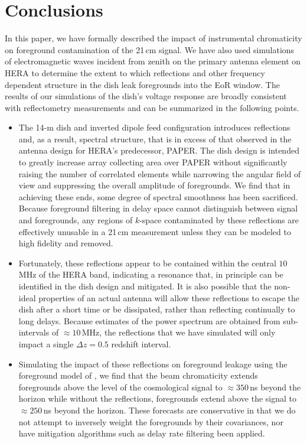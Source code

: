 \documentclass[twocolumn]{emulateapj}
\begin{document}
\section{Conclusions}\label{sec:Conclusion}
In this paper, we have formally described the impact of instrumental chromaticity on foreground contamination of the 21\,cm signal. We have also used simulations of electromagnetic waves incident from zenith on the primary antenna element on HERA to determine the extent to which reflections and other frequency dependent structure in the dish leak foregrounds into the EoR window. The results of our simulations of the dish's voltage response are broadly consistent with reflectometry measurements \citep{Patra:2016} and can be summarized in the following points. 
\begin{itemize}
\item The 14-m dish and inverted dipole feed configuration introduces reflections and, as a result, spectral structure, that is in excess of that observed in the antenna design for HERA's predecessor, PAPER. The dish design is intended to greatly increase array collecting area over PAPER without significantly raising the number of correlated elements while narrowing the angular field of view and suppressing the overall amplitude of foregrounds. We find that in achieving these ends, some degree of spectral smoothness has been sacrificed. Because foreground filtering in delay space cannot distinguish between signal and foregrounds, any regions of $k$-space contaminated by these reflections are effectively unusable in a 21\,cm measurement unless they can be modeled to high fidelity and removed. 

\item Fortunately, these reflections appear to be contained within the central $10$\,MHz of the HERA band, indicating a resonance that, in principle can be identified in the dish design and mitigated. It is also possible that the  non-ideal properties of an actual antenna will allow these reflections to escape the dish after a short time or be dissipated, rather than reflecting continually to long delays. Because estimates of the power spectrum are obtained from sub-intervals of $\approx10$\,MHz, the reflections that we have simulated will only impact a single $\Delta z=0.5$ redshift interval.

\item Simulating the impact of these reflections on foreground leakage using the foreground model of \citet{Thyagarajan:2016}, we find that the beam chromaticity extends foregrounds above the level of the cosmological signal to $\approx 350$\,ns beyond the horizon while without the reflections, foregrounds extend above the signal to $\approx 250$\,ns beyond the horizon. These forecasts are conservative in that we do not attempt to inversely weight the foregrounds by their covariances, nor have mitigation algorithms such as delay rate filtering been applied.


\end{itemize}
\end{document}
